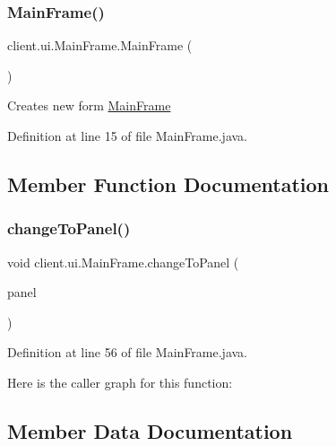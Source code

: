 \subsubsection{\texorpdfstring{Main\+Frame()}{MainFrame()}}
{\footnotesize\ttfamily client.\+ui.\+Main\+Frame.\+Main\+Frame (\begin{DoxyParamCaption}{ }\end{DoxyParamCaption})}

Creates new form \hyperlink{classclient_1_1ui_1_1_main_frame}{Main\+Frame} 

Definition at line 15 of file Main\+Frame.\+java.



\subsection{Member Function Documentation}
\hypertarget{classclient_1_1ui_1_1_main_frame_ae415687be6f7197dd0d70d65d08d5221}{}\label{classclient_1_1ui_1_1_main_frame_ae415687be6f7197dd0d70d65d08d5221} 
\subsubsection{\texorpdfstring{change\+To\+Panel()}{changeToPanel()}}
{\footnotesize\ttfamily void client.\+ui.\+Main\+Frame.\+change\+To\+Panel (\begin{DoxyParamCaption}\item[{javax.\+swing.\+J\+Component}]{panel }\end{DoxyParamCaption})}



Definition at line 56 of file Main\+Frame.\+java.

Here is the caller graph for this function\+:


\subsection{Member Data Documentation}
\hypertarget{classclient_1_1ui_1_1_main_frame_adc5b4f5b4aa376358a04eddef4741233}{}\label{classclient_1_1ui_1_1_main_frame_adc5b4f5b4aa376358a04eddef4741233} 

